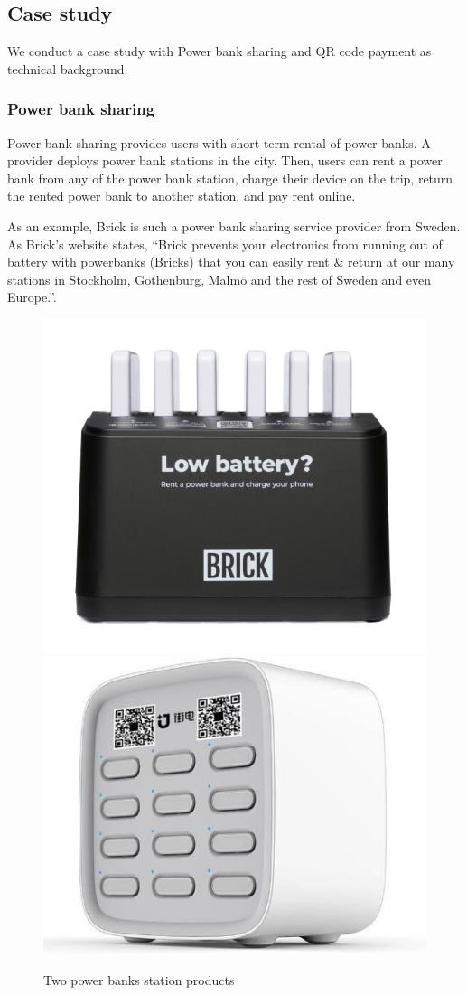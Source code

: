 \subsection{Case study}

We conduct a case study with Power bank sharing and QR code payment as technical background.

\subsubsection{Power bank sharing}

Power bank sharing provides users with short term rental of power banks. A provider deploys power bank stations in the city. Then, users can rent a power bank from any of the power bank station, charge their device on the trip, return the rented power bank to another station, and pay rent online.

As an example, Brick is such a power bank sharing service provider from Sweden. As Brick's website states, ``Brick prevents your electronics from running out of battery with powerbanks (Bricks) that you can easily rent \& return at our many stations in Stockholm, Gothenburg, Malmö and the rest of Sweden and even Europe.''. 


\begin{figure}[hbtp]
	\centering
	\includegraphics[width=.4 \linewidth]{./Figs/Brick_station.png}
	\includegraphics[width=.4 \linewidth]{./Figs/jiedian.jpg}
	\caption{Two power banks station products}
	\label{fig:PBS_products}
\end{figure}


